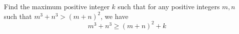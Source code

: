 Find the maximum positive integer $k$ such that for any positive integers $m,n$ such that $m^3+n^3>(m+n)^2$,  we have$$m^3+n^3\geq (m+n)^2+k$$